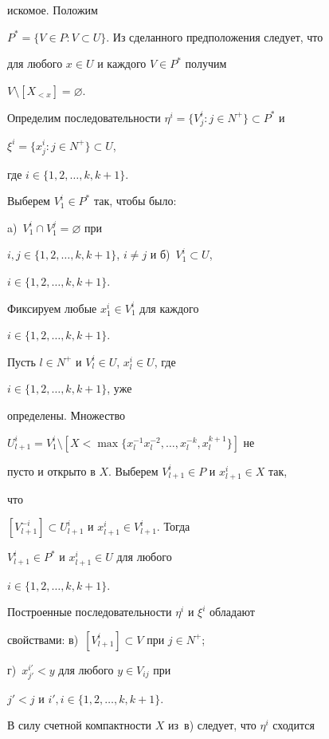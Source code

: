 искомое. Положим  


$P^*=\{V\in P:V\subset U\}$. Из сделанного предположения следует, что  


для любого $x\in U$ и каждого $V\in P^*$ получим 


$V\setminus[X_{<x}]=\varnothing$. 


Определим последовательности $\eta^i=\{V^i_j:j\in N^+\}\subset P^*$ и 


$\xi^i=\{x^i_j:j\in N^+\}\subset U$, 


где $i\in\{1,2,\dotsc,k,k+1\}$. 


 


Выберем $V^i_1\in P^*$ так, чтобы было: 


a)~$V^i_1\cap V^j_1=\varnothing$ при 


$i,j\in\{1,2,\dotsc,k,k+1\}$, $i\ne j$ и б)~$V^i_1\subset U$, 


$i\in\{1,2,\dotsc,k,k+1\}$. 


 


Фиксируем любые $x^i_1\in V^i_1$ для каждого 


$i\in\{1,2,\dotsc,k,k+1\}$. 


Пусть $l\in N^+$ и $V^i_l\in U$, $x^i_l\in U$, где 


$i\in\{1,2,\dotsc,k,k+1\}$, уже  


определены. Множество 


$U^i_{l+1}=V^i_1\setminus[X<\max\{x^{-1}_lx^{-2}_l,\dotsc, 


x^{-k}_l,x^{k+1}_l\}]$ не 


пусто и открыто в $X$. Выберем $V^i_{l+1}\in P$ и $x^i_{l+1}\in X$ так, 


что  


$[V^{-i}_{l+1}]\subset U^i_{l+1}$ и $x^i_{l+1}\in V^i_{l+1}$. Тогда 


$V^i_{l+1}\in P^*$ и $x^i_{l+1}\in U$ для любого 


$i\in\{1,2,\dotsc,k,k+1\}$. 


Построенные последовательности $\eta^i$ и $\xi^i$ обладают  


свойствами: в)~$[V^i_{l+1}]\subset V$ при $j\in N^+$; 


г)~$x^{i'}_{j'}<y$ для любого $y\in V_{ij}$ при 


$j'<j$ и $i',i\in\{1,2,\dotsc,k,k+1\}$. 


В силу счетной компактности $X$ из~в) следует, что $\eta^i$ сходится  


